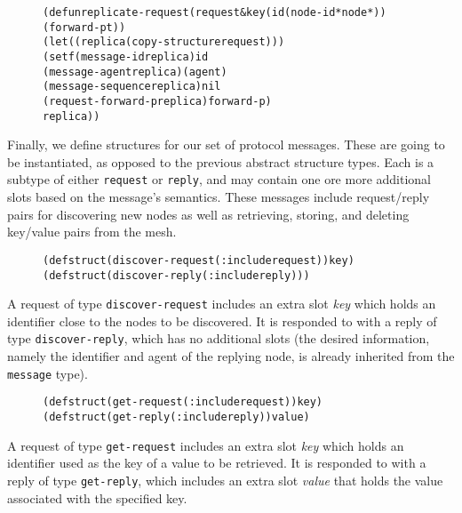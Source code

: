 \documentclass [a4paper,12pt,oneside]{article}\usepackage [paper=a4paper,left=37.5264mm,right=37.5264mm,top=37.5264mm,bottom=37.5264mm]{geometry}\usepackage {graphicx}\usepackage {tabularx}\usepackage {alltt}\usepackage {float}\usepackage [section]{placeins}\usepackage {titling}\setlength {\droptitle }{-4em}\pretitle {\begin {flushright}\bfseries \LARGE }\posttitle {\end {flushright}}\preauthor {\begin {flushright}}\postauthor {\end {flushright}}\predate {\begin {flushright}}\postdate {\end {flushright}}\usepackage [english]{babel}\usepackage [T1]{fontenc}\usepackage [utf8x]{inputenc}\usepackage {stmaryrd}\usepackage {amsfonts}\DeclareUnicodeCharacter {12314}{$\llbracket $}\DeclareUnicodeCharacter {12315}{$\rrbracket $}\DeclareUnicodeCharacter {9655}{$\rhd $}\newcommand \nobreakdash {\mbox {-}}\DeclareUnicodeCharacter {8209}{\nobreakdash }\usepackage [sc]{mathpazo}\linespread {1.05}\usepackage [font={small},labelformat=empty,labelsep=none]{caption}\tolerance=10000 \clubpenalty=10000 \widowpenalty=10000 \frenchspacing
\begin{document}
\begin {figure}[H]\centering \begin {alltt}
(defun replicate-request (request \&key (id (node-id *node*)) (forward-p t))
  (let ((replica (copy-structure request)))
    (setf (message-id replica) id
          (message-agent replica) (agent)
          (message-sequence replica) nil
          (request-forward-p replica) forward-p)
    replica))
\end{alltt}\vspace {-1em}\end {figure}

Finally, we define structures for our set of protocol messages. These are going to be instantiated, as opposed to the previous abstract structure types. Each is a subtype of either \texttt {request} or \texttt {reply}, and may contain one ore more additional slots based on the message’s semantics. These messages include request/reply pairs for discovering new nodes as well as retrieving, storing, and deleting key/value pairs from the mesh.

\begin {figure}[H]\centering \begin {alltt}
(defstruct (discover-request (:include request)) key)
(defstruct (discover-reply (:include reply)))
\end{alltt}\vspace {-1em}\end {figure}

A request of type \texttt {discover-request} includes an extra slot \textit {key} which holds an identifier close to the nodes to be discovered. It is responded to with a reply of type \texttt {discover-reply}, which has no additional slots (the desired information, namely the identifier and agent of the replying node, is already inherited from the \texttt {message} type).

\begin {figure}[H]\centering \begin {alltt}
(defstruct (get-request (:include request)) key)
(defstruct (get-reply (:include reply)) value)
\end{alltt}\vspace {-1em}\end {figure}

A request of type \texttt {get-request} includes an extra slot \textit {key} which holds an identifier used as the key of a value to be retrieved. It is responded to with a reply of type \texttt {get-reply}, which includes an extra slot \textit {value} that holds the value associated with the specified key.
\end{document}
